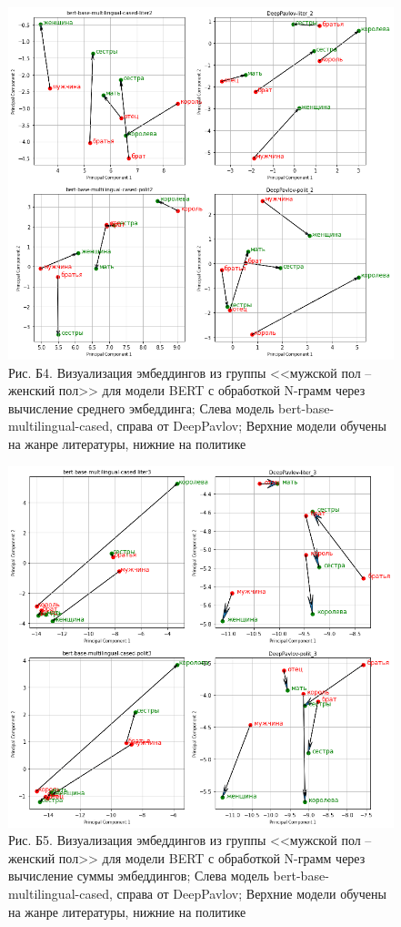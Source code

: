 \documentclass[a4paper,14pt]{article}
\begin{document}
\begin{figure}[H]
	\centering
	\includegraphics[width=0.95\linewidth]{image/fam_2}
	\caption*{Рис. Б4. Визуализация эмбеддингов из группы <<мужской пол -- женский пол>> для модели BERT с обработкой N-грамм через вычисление среднего эмбеддинга; Слева модель bert-base-multilingual-cased, справа от DeepPavlov; Верхние модели обучены на жанре литературы, нижние на политике}
	\label{fig:fam2}
\end{figure}

\begin{figure}[H]
	\centering
	\includegraphics[width=0.95\linewidth]{image/fam_3}
	\caption*{Рис. Б5. Визуализация эмбеддингов из группы <<мужской пол -- женский пол>> для модели BERT с обработкой N-грамм через вычисление суммы эмбеддингов; Слева модель bert-base-multilingual-cased, справа от DeepPavlov; Верхние модели обучены на жанре литературы, нижние на политике}
	\label{fig:fam3}
\end{figure}
\end{document}
